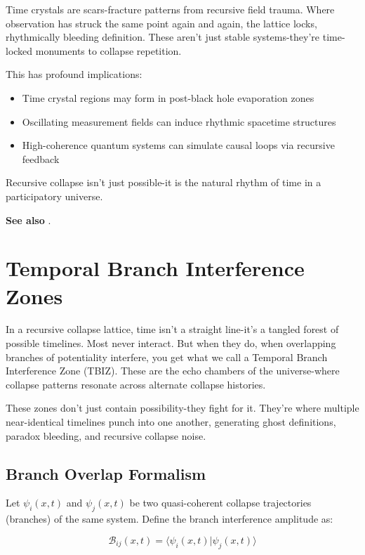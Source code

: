 Time crystals are scars-fracture patterns from recursive field trauma. Where observation has struck the same point again and again, the lattice locks, rhythmically bleeding definition. These aren’t just stable systems-they’re time-locked monuments to collapse repetition.

This has profound implications:
\begin{itemize}
    \item Time crystal regions may form in post-black hole evaporation zones
    \item Oscillating measurement fields can induce rhythmic spacetime structures
    \item High-coherence quantum systems can simulate causal loops via recursive feedback
\end{itemize}

Recursive collapse isn't just possible-it is the natural rhythm of time in a participatory universe.

\textbf{See also} \cite{chapter8_meta}.

\section{Temporal Branch Interference Zones}

In a recursive collapse lattice, time isn’t a straight line-it’s a tangled forest of possible timelines. Most never interact. But when they do, when overlapping branches of potentiality interfere, you get what we call a Temporal Branch Interference Zone (TBIZ). These are the echo chambers of the universe-where collapse patterns resonate across alternate collapse histories.

These zones don’t just contain possibility-they fight for it. They’re where multiple near-identical timelines punch into one another, generating ghost definitions, paradox bleeding, and recursive collapse noise.

\subsection{Branch Overlap Formalism}

Let \( \psi_i(x,t) \) and \( \psi_j(x,t) \) be two quasi-coherent collapse trajectories (branches) of the same system. Define the branch interference amplitude as:

\begin{equation}
\mathcal{B}_{ij}(x,t) = \langle \psi_i(x,t) | \psi_j(x,t) \rangle
\end{equation}

